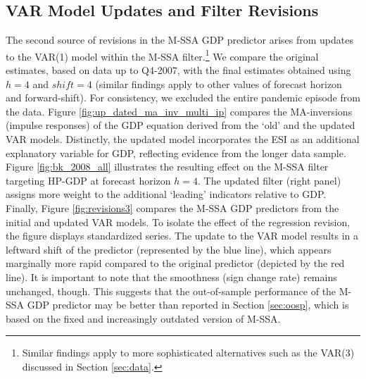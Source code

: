 \documentclass[11pt,a4paper]{article}
\begin{document}
\subsection{VAR Model Updates and Filter Revisions}
The second source of revisions in the M-SSA GDP predictor arises from updates to the VAR(1) model within the M-SSA filter.\footnote{Similar findings apply to more sophisticated alternatives such as the VAR(3) discussed in Section \ref{sec:data}.} 
We compare the original estimates, based on data up to Q4-2007, with the final estimates obtained using $h=4$ and $shift=4$ (similar findings apply to other values of forecast horizon and forward-shift). For consistency, we excluded the entire pandemic episode from the data. 
Figure \ref{fig:up_dated_ma_inv_multi_ip} compares the MA-inversions (impulse responses) of the GDP equation derived from the `old' and the updated VAR models. Distinctly, the updated model incorporates the ESI as an additional explanatory variable for GDP, reflecting evidence from the longer data sample. Figure \ref{fig:bk_2008_all} illustrates the resulting effect on the M-SSA filter targeting HP-GDP at forecast horizon $h=4$. The updated filter (right panel) assigns more weight to the additional `leading' indicators relative to GDP. Finally, Figure \ref{fig:revisions3} compares the M-SSA GDP predictors from the initial and updated VAR models. To isolate the effect of the regression revision, the figure displays standardized series. The update to the VAR model results in a leftward shift of the predictor (represented by the blue line), which appears marginally more rapid compared to the original predictor (depicted by the red line). It is important to note that the smoothness (sign change rate) remains unchanged, though. 
This suggests that the out-of-sample performance of the M-SSA GDP predictor may be better than reported in Section \ref{sec:oosp}, which is based on the fixed and increasingly outdated version of M-SSA.
\end{document}
